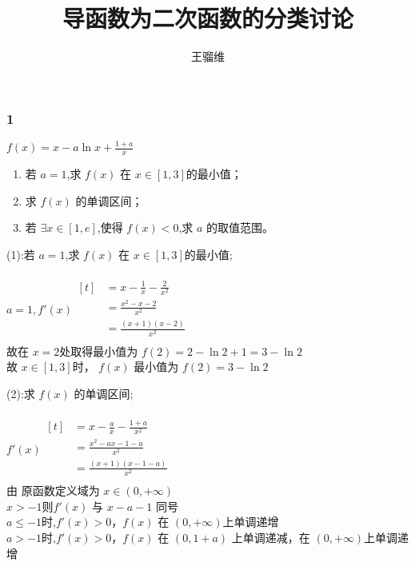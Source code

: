 \documentclass{ctexbeamer}
\begin{document}
\title{导函数为二次函数的分类讨论}
\author{王骝维}

\frame{\titlepage}

\frametitle{1}
\begin{frame}

    $f(x)=x-a\ln{x}+\frac{1+a}{x}$
    \begin{enumerate}[label=(\arabic*)]
        \item   若 $a=1$,求 $f(x)$ 在 $x \in [1,3]$的最小值；
\item   求 $f(x)$ 的单调区间；
\item   若 $\exists x \in [1,e]$,使得 $f(x)<0$,求 $a$ 的取值范围。
    \end{enumerate}

\end{frame}

\begin{frame}
(1):若 $a=1$,求 $f(x)$ 在 $x \in [1,3]$的最小值;\\
\quad\\
    $a=1,f'(x)
        \begin{aligned}[t]
             & =x-\frac{1}{x}-\frac{2}{x^2} \\
             & =\frac{x^2-x-2}{x^2}         \\
             & =\frac{(x+1)(x-2)}{x^2}      \\
\end{aligned}$\\
    故在 $x=2$处取得最小值为 $f(2)=2-\ln{2}+1=3-\ln{2}$\\
故 $x \in [1,3]$时， $f(x)$ 最小值为 $f(2)=3-\ln{2}$\\
\end{frame}

\begin{frame}
(2):求 $f(x)$ 的单调区间;\\
\quad\\
    $f'(x)
        \begin{aligned}[t]
             & =x-\frac{a}{x}-\frac{1+a}{x^2} \\
             & =\frac{x^2-ax-1-a}{x^2}        \\
             & =\frac{(x+1)(x-1-a)}{x^2}      \\
\end{aligned}$\\
    由 原函数定义域为 $x\in(0,+\infty)$\\
$x>-1$则$ f'(x)$ 与 $x-a-1$ 同号\\
$a \leqslant -1$时,$f'(x)>0，f(x)$ 在 $(0,+\infty)$上单调递增\\
$a> -1$时,$f'(x)>0，f(x)$ 在 $(0,1+a)$ 上单调递减，在 $(0,+\infty)$上单调递增\\

\end{frame}
\end{document}

